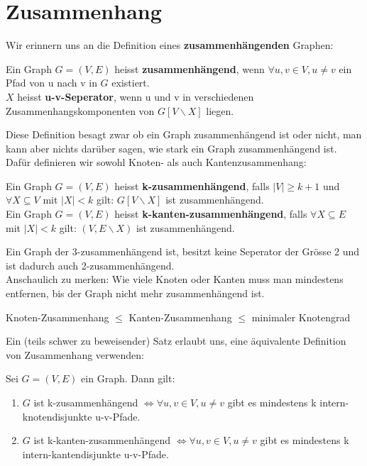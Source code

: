 \documentclass[a4paper]{report}
\begin{document}
\chapter{Zusammenhang}

Wir erinnern uns an die Definition eines \textbf{zusammenhängenden} Graphen:

\begin{definition}
    Ein Graph $G = (V,E)$ heisst \textbf{zusammenhängend}, wenn $\forall u,v \in V, u \neq v$ 
    ein Pfad von u nach v in $G$ existiert. \\

    $X$ heisst \textbf{u-v-Seperator}, wenn u und v in verschiedenen Zusammenhangskomponenten von
    $G[V \backslash X]$ liegen.
\end{definition}
\bigskip

Diese Definition besagt zwar ob ein Graph zusammenhängend ist oder nicht, man kann aber nichts darüber sagen,
wie stark ein Graph zusammenhängend ist. Dafür definieren wir sowohl Knoten- als auch Kantenzusammenhang:

\begin{definition}
    Ein Graph $G = (V,E)$ heisst \textbf{k-zusammenhängend}, falls $|V| \geq k + 1$ und $\forall X \subseteq V$
    mit $|X| < k$ gilt: $G[V \backslash X]$ ist zusammenhängend. \\

    Ein Graph $G = (V,E)$ heisst \textbf{k-kanten-zusammenhängend}, falls $\forall X \subseteq E$
    mit $|X| < k$ gilt: $(V, E \backslash X)$ ist zusammenhängend.
\end{definition}
\bigskip

Ein Graph der 3-zusammenhängend ist, besitzt keine Seperator der Grösse 2 und ist dadurch auch 2-zusammenhängend. \\

Anschaulich zu merken: Wie viele Knoten oder Kanten muss man mindestens entfernen, bis der Graph nicht mehr
zusammenhängend ist.

\begin{lemma}
    Knoten-Zusammenhang $\leq$ Kanten-Zusammenhang $\leq$ minimaler Knotengrad
\end{lemma}
\bigskip

Ein (teils schwer zu beweisender) Satz erlaubt uns, eine äquivalente Definition von Zusammenhang
verwenden:

\begin{satz}
    Sei $G = (V, E)$ ein Graph. Dann gilt:
    \begin{enumerate}
        \item $G$ ist k-zusammenhängend $\Leftrightarrow \forall u,v \in V, u \neq v$ gibt es mindestens k intern-knotendisjunkte u-v-Pfade.
        \item $G$ ist k-kanten-zusammenhängend $\Leftrightarrow \forall u,v \in V, u \neq v$ gibt es mindestens k intern-kantendisjunkte u-v-Pfade.
    \end{enumerate}
\end{satz}
\bigskip
\end{document}
